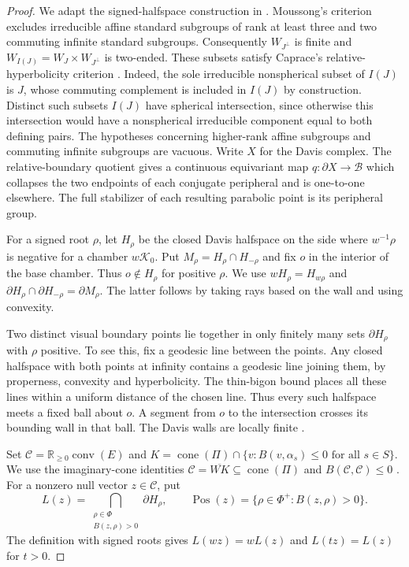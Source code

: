 \documentclass[11pt,reqno]{amsart}
\theoremstyle{plain}
\theoremstyle{definition}
\theoremstyle{remark}
\numberwithin{equation}{section}
\begin{document}
\begin{proof}
We adapt the signed-halfspace construction in \cite[Section~3]{WangUniqueness}.
Moussong's criterion excludes irreducible affine standard subgroups of
rank at least three and two commuting infinite standard subgroups.
Consequently $W_{J^\perp}$ is finite and
$W_{I(J)}=W_J\times W_{J^\perp}$ is two-ended. These subsets
satisfy Caprace's relative-hyperbolicity criterion \cite{Caprace2009,CapraceErratum}.
Indeed, the sole irreducible nonspherical subset of $I(J)$ is $J$,
whose commuting complement is included in $I(J)$ by construction.
Distinct such subsets $I(J)$ have spherical intersection, since
otherwise this intersection would have a nonspherical irreducible
component equal to both defining pairs. The hypotheses concerning
higher-rank affine subgroups and commuting infinite subgroups are
vacuous. Write $X$ for the Davis complex. The relative-boundary
quotient \cite{Tran} gives a continuous equivariant map
$q:\partial X\to\mathcal B$ which collapses the two endpoints of
each conjugate peripheral and is one-to-one elsewhere. The full
stabilizer of each resulting parabolic point is its peripheral group.

For a signed root $\rho$, let $H_\rho$ be the closed Davis halfspace on
the side where $w^{-1}\rho$ is negative for a chamber $w\mathcal K_0$.
Put $M_\rho=H_\rho\cap H_{-\rho}$ and fix $o$ in the interior of
the base chamber. Thus $o\notin H_\rho$ for positive $\rho$. We use
$wH_\rho=H_{w\rho}$ and
$\partial H_\rho\cap\partial H_{-\rho}=\partial M_\rho$.
The latter follows by taking rays based on the wall and using convexity.

Two distinct visual boundary points lie together in only finitely many
sets $\partial H_\rho$ with $\rho$ positive. To see this, fix a
geodesic line between the points. Any closed halfspace with both points
at infinity contains a geodesic line joining them, by properness,
convexity and hyperbolicity. The thin-bigon bound places all these
lines within a uniform distance of the chosen line. Thus every such
halfspace meets a fixed ball about $o$. A segment from $o$ to the
intersection crosses its bounding wall in that ball. The Davis walls
are locally finite \cite{Davis2008}.

Set $\mathcal C=\mathbb R_{\geq0}\operatorname{conv}(E)$ and
$K=\operatorname{cone}(\Pi)\cap
\{v:B(v,\alpha_s)\leq0\text{ for all }s\in S\}$.
We use the imaginary-cone identities
$\mathcal C=\overline{WK}\subseteq\operatorname{cone}(\Pi)$
and $B(\mathcal C,\mathcal C)\leq0$ \cite{DHR}.
For a nonzero null vector $z\in\mathcal C$, put
\[
  L(z)=\bigcap_{\substack{\rho\in\Phi\\B(z,\rho)>0}}
              \partial H_\rho,\qquad
  \operatorname{Pos}(z)=\{\rho\in\Phi^+:B(z,\rho)>0\}.
\]
The definition with signed roots gives $L(wz)=wL(z)$ and
$L(tz)=L(z)$ for $t>0$.


\end{proof}
\end{document}
